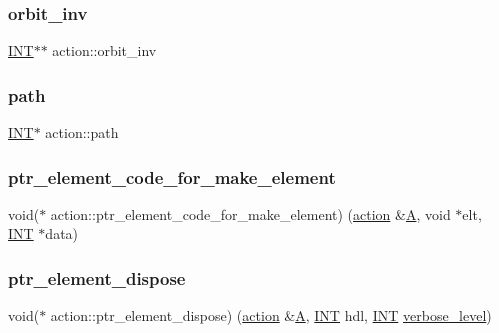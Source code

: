 \subsubsection{\texorpdfstring{orbit\+\_\+inv}{orbit\_inv}}
{\footnotesize\ttfamily \mbox{\hyperlink{galois_8h_a09fddde158a3a20bd2dcadb609de11dc}{I\+NT}}$\ast$$\ast$ action\+::orbit\+\_\+inv}

\mbox{\label{classaction_a951bd7f26281872b3102bad61860dfd8}} 
\subsubsection{\texorpdfstring{path}{path}}
{\footnotesize\ttfamily \mbox{\hyperlink{galois_8h_a09fddde158a3a20bd2dcadb609de11dc}{I\+NT}}$\ast$ action\+::path}

\mbox{\label{classaction_aeab66907f979772b457317ad292cf8ff}} 
\subsubsection{\texorpdfstring{ptr\+\_\+element\+\_\+code\+\_\+for\+\_\+make\+\_\+element}{ptr\_element\_code\_for\_make\_element}}
{\footnotesize\ttfamily void($\ast$ action\+::ptr\+\_\+element\+\_\+code\+\_\+for\+\_\+make\+\_\+element) (\mbox{\hyperlink{classaction}{action}} \&\mbox{\hyperlink{simeon_8_c_a97833f04c3a9c008df5521a2fc291bb4}{A}}, void $\ast$elt, \mbox{\hyperlink{galois_8h_a09fddde158a3a20bd2dcadb609de11dc}{I\+NT}} $\ast$data)}

\mbox{\label{classaction_a16242bf8b78f930db87a29d0f6e21cdf}} 
\subsubsection{\texorpdfstring{ptr\+\_\+element\+\_\+dispose}{ptr\_element\_dispose}}
{\footnotesize\ttfamily void($\ast$ action\+::ptr\+\_\+element\+\_\+dispose) (\mbox{\hyperlink{classaction}{action}} \&\mbox{\hyperlink{simeon_8_c_a97833f04c3a9c008df5521a2fc291bb4}{A}}, \mbox{\hyperlink{galois_8h_a09fddde158a3a20bd2dcadb609de11dc}{I\+NT}} hdl, \mbox{\hyperlink{galois_8h_a09fddde158a3a20bd2dcadb609de11dc}{I\+NT}} \mbox{\hyperlink{simeon_8_c_a818073fbcc2f439e7c56952f67386122}{verbose\+\_\+level}})}

